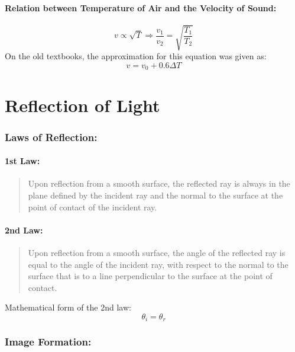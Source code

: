\documentclass[a4paper]{report}
\begin{document}
        \subsubsection{Relation between Temperature of Air and the Velocity of Sound: }
            \begin{equation}
                v \propto \sqrt{T} \Rightarrow \frac{v_1}{v_2} = \sqrt{\frac{T_1}{T_2}}
            \end{equation}
            On the old textbooks, the approximation for this equation was given as:
            \begin{equation}
                v = v_0 + 0.6 \Delta T
            \end{equation}

\chapter{Reflection of Light}
    \subsection{Laws of Reflection: }
        \subsubsection{1st Law:}
            \begin{quotation}
                Upon reflection from a smooth surface, the reflected ray is always in the plane defined by the incident ray and the normal to the surface at the point of contact of the incident ray.
            \end{quotation}
        \subsubsection{2nd Law:}
            \begin{quotation}
                Upon reflection from a smooth surface, the angle of the reflected ray is equal to the angle of the incident ray, with respect to the normal to the surface that is to a line perpendicular to the surface at the point of contact.
            \end{quotation}
            Mathematical form of the 2nd law:
            \begin{equation}
                \theta_i = \theta_r
            \end{equation}
    \subsection{Image Formation: }
\end{document}
